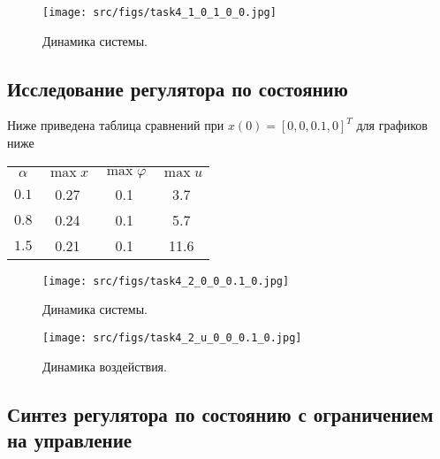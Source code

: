 \begin{figure}[ht!]
    \centering
    \texttt{[image: src/figs/task4\_1\_0\_1\_0\_0.jpg]}
    \caption{Динамика системы.}
    \label{fig:task4_1_6}
\end{figure}

\FloatBarrier

\subsection{Исследование регулятора по состоянию}
Ниже приведена таблица сравнений при \(x(0) = [0, 0, 0.1, 0]^T\) для графиков ниже
\begin{center}
    \begin{tabular}{ c | c c c }
$\alpha$ & $\max x$ & $\max \varphi$ & $\max u$ \\
        $0.1$ & 0.27 & 0.1 & 3.7 \\
        $0.8$ & 0.24 & 0.1 & 5.7 \\
        $1.5$ & 0.21 & 0.1 & 11.6 \\
    \end{tabular}
\end{center}

\begin{figure}[ht!]
    \centering
    \texttt{[image: src/figs/task4\_2\_0\_0\_0.1\_0.jpg]}
    \caption{Динамика системы.}
    \label{fig:task4_2_1}
\end{figure}
\begin{figure}[ht!]
    \centering
    \texttt{[image: src/figs/task4\_2\_u\_0\_0\_0.1\_0.jpg]}
    \caption{Динамика воздействия.}
    \label{fig:task4_2_2}
\end{figure}
\FloatBarrier

\subsection{Синтез регулятора по состоянию с ограничением на управление}

